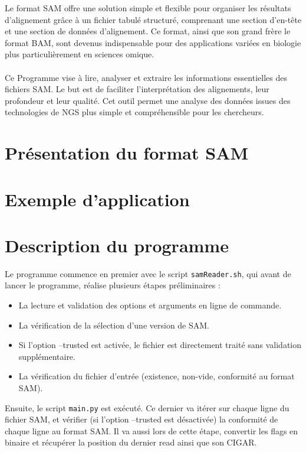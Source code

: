 \documentclass[11pt]{article}
\begin{document}
\noindent Le format SAM offre une solution simple et flexible pour organiser les résultats d'alignement grâce à un fichier tabulé structuré, comprenant une section d'en-tête et une section de données d'alignement.
Ce format, ainsi que son grand frère le format BAM, sont devenus indispensable pour des applications variées en biologie plus particulièrement en sciences omique.
\\\\
Ce Programme vise à lire, analyser et extraire les informations essentielles des fichiers SAM\@.
Le but est de faciliter l'interprétation des alignements, leur profondeur et leur qualité.
Cet outil permet une analyse des données issues des technologies de NGS plus simple et compréhensible pour les chercheurs.


\section{Présentation du format SAM}\label{sec:presentation-du-format-sam}


\section{Exemple d'application}\label{sec:exemple-d'application}


\section{Description du programme}\label{sec:description-du-programme}

Le programme commence en premier avec le script \texttt{samReader.sh}, qui avant de lancer le programme, réalise plusieurs étapes préliminaires :
\begin{itemize}
\item La lecture et validation des options et arguments en ligne de commande.
\item La vérification de la sélection d'une version de SAM.
\item Si l’option --trusted est activée, le fichier est directement traité sans validation supplémentaire.
\item La vérification du fichier d’entrée (existence, non-vide, conformité au format SAM).
\end{itemize}

\noindent Ensuite, le script \texttt{main.py} est exécuté.
Ce dernier va itérer sur chaque ligne du fichier SAM, et vérifier (si l’option --trusted est désactivée) la conformité de chaque ligne au format SAM.
Il va aussi lors de cette étape, convertir les flags en binaire et récupérer la position du dernier read ainsi que son CIGAR.
\end{document}
